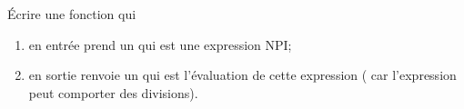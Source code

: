 \documentclass[a4paper,12pt,french]{article}
\begin{document}
\begin{exercice}
\'Ecrire une fonction  qui
\begin{enumerate}[--]
	\item 	en entrée prend un  qui est une expression NPI;
	\item 	en sortie renvoie un  qui est l'évaluation de cette expression ( car l'expression peut comporter des divisions).	
\end{enumerate}
\end{exercice}
\end{document}
